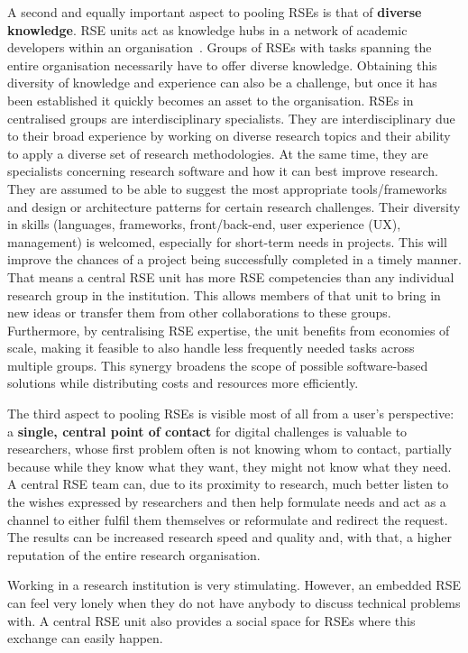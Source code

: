\documentclass[a4paper]{article}
\begin{document}
A second and equally important aspect to pooling RSEs is that of \textbf{diverse knowledge}.
RSE units act as knowledge hubs in a network of academic developers within an organisation~\autocite{Elsholz2006}.
Groups of RSEs with tasks spanning the entire organisation necessarily have to offer diverse knowledge.
Obtaining this diversity of knowledge and experience can also be a challenge, but once it has been established it quickly becomes an asset to the organisation.
RSEs in centralised groups are interdisciplinary specialists.
They are interdisciplinary due to their broad experience by working on diverse research topics and their ability to apply a diverse set of research methodologies.
At the same time, they are specialists concerning research software and how it can best improve research.
They are assumed to be able to suggest the most appropriate tools/frameworks and design or architecture patterns for certain research challenges.
Their diversity in skills (languages, frameworks, front/back-end, user experience (UX), management) is welcomed, especially for short-term needs in projects.
This will improve the chances of a project being successfully completed in a timely manner.
That means a central RSE unit has more RSE competencies than any individual research group in the institution.
This allows members of that unit to bring in new ideas or transfer them from other collaborations to these groups.
Furthermore, by centralising RSE expertise, the unit benefits from economies of scale, making it feasible to also handle less frequently needed tasks across multiple groups.
This synergy broadens the scope of possible software-based solutions while distributing costs and resources more efficiently.

The third aspect to pooling RSEs is visible most of all from a user's perspective: a \textbf{single, central point of contact} for digital challenges is valuable to researchers, whose first problem often is not knowing whom to contact, partially because while they know what they want, they might not know what they need.
A central RSE team can, due to its proximity to research, much better listen to the wishes expressed by researchers and then help formulate needs and act as a channel to either fulfil them themselves or reformulate and redirect the request.
The results can be increased research speed and quality and, with that, a higher reputation of the entire research organisation.

Working in a research institution is very stimulating.
However, an embedded RSE can feel very lonely when they do not have anybody to discuss technical problems with.
A central RSE unit also provides a social space for RSEs where this exchange can easily happen.
\end{document}
